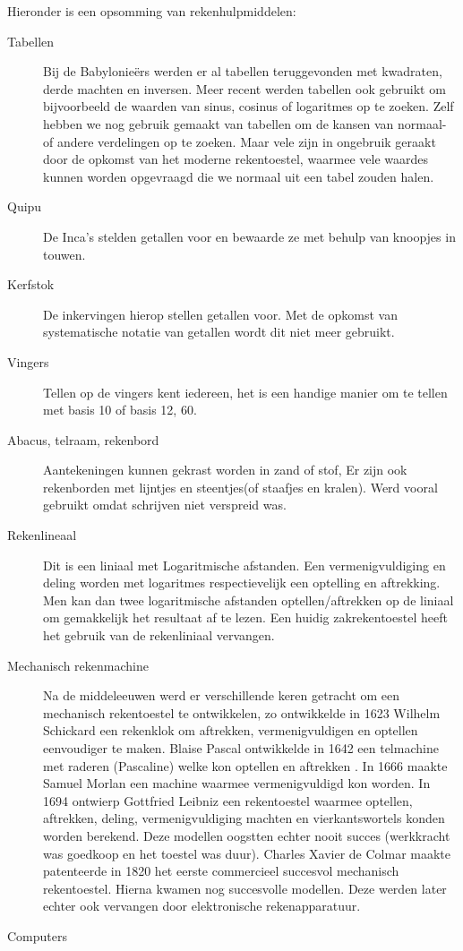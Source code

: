 \documentclass[../main.tex]{subfiles}
\begin{document}
\begin{solution}
Hieronder is een opsomming van rekenhulpmiddelen:
	\begin{description}
		\item[Tabellen] Bij de Babylonie\"ers werden er al tabellen teruggevonden met kwadraten, derde machten en inversen. Meer recent werden tabellen ook gebruikt om bijvoorbeeld de waarden van sinus, cosinus of logaritmes op te zoeken.
		Zelf hebben we nog gebruik gemaakt van tabellen om de kansen van normaal- of andere verdelingen op te zoeken. Maar vele zijn in ongebruik geraakt door de opkomst van het moderne rekentoestel, waarmee vele waardes kunnen worden opgevraagd die we normaal uit een tabel zouden halen.
		\item[Quipu] De Inca's stelden getallen voor en bewaarde ze met behulp van knoopjes in touwen.
		\item[Kerfstok] De inkervingen hierop stellen getallen voor. Met de opkomst van systematische notatie van getallen wordt dit niet meer gebruikt.
		\item[Vingers] Tellen op de vingers kent iedereen, het is een handige manier om te tellen met basis 10 of basis 12, 60.
		\item[Abacus, telraam, rekenbord] Aantekeningen kunnen gekrast worden in zand of stof, Er zijn ook rekenborden met lijntjes en steentjes(of staafjes en kralen). Werd vooral gebruikt omdat schrijven niet verspreid was.
		\item[Rekenlineaal] Dit is een liniaal met Logaritmische afstanden. Een vermenigvuldiging en deling worden met logaritmes respectievelijk een optelling en aftrekking. Men kan dan twee logaritmische afstanden optellen/aftrekken op de liniaal om gemakkelijk het resultaat af te lezen. Een huidig zakrekentoestel heeft het gebruik van de rekenliniaal vervangen.
		\item[Mechanisch rekenmachine] Na de middeleeuwen werd er verschillende keren getracht om een mechanisch rekentoestel te ontwikkelen, zo ontwikkelde in 1623 Wilhelm Schickard een rekenklok om aftrekken, vermenigvuldigen en optellen eenvoudiger te maken. Blaise Pascal ontwikkelde in 1642 een telmachine met raderen (Pascaline) welke kon optellen en aftrekken . In 1666 maakte Samuel Morlan een machine waarmee vermenigvuldigd kon worden. In 1694 ontwierp Gottfried Leibniz een rekentoestel waarmee optellen, aftrekken, deling, vermenigvuldiging machten en vierkantswortels konden worden berekend. Deze modellen oogstten echter nooit succes (werkkracht was goedkoop en het toestel was duur). Charles Xavier de Colmar maakte patenteerde in 1820 het eerste commercieel succesvol mechanisch rekentoestel. Hierna kwamen nog succesvolle modellen. Deze werden later echter ook vervangen door elektronische rekenapparatuur.
		\item[Computers]

	\end{description}
\end{solution}
\end{document}
